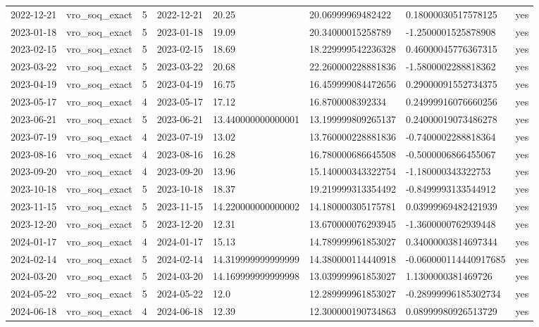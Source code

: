 \begin{tabular}{llllllll}
2022-12-21 & vro\_soq\_exact & 5 & 2022-12-21 & 20.25 & 20.06999969482422 & 0.18000030517578125 & yes \\
2023-01-18 & vro\_soq\_exact & 5 & 2023-01-18 & 19.09 & 20.34000015258789 & -1.2500001525878908 & yes \\
2023-02-15 & vro\_soq\_exact & 5 & 2023-02-15 & 18.69 & 18.229999542236328 & 0.46000045776367315 & yes \\
2023-03-22 & vro\_soq\_exact & 5 & 2023-03-22 & 20.68 & 22.260000228881836 & -1.5800002288818362 & yes \\
2023-04-19 & vro\_soq\_exact & 5 & 2023-04-19 & 16.75 & 16.459999084472656 & 0.29000091552734375 & yes \\
2023-05-17 & vro\_soq\_exact & 4 & 2023-05-17 & 17.12 & 16.8700008392334 & 0.24999916076660256 & yes \\
2023-06-21 & vro\_soq\_exact & 5 & 2023-06-21 & 13.440000000000001 & 13.199999809265137 & 0.24000019073486278 & yes \\
2023-07-19 & vro\_soq\_exact & 4 & 2023-07-19 & 13.02 & 13.760000228881836 & -0.7400002288818364 & yes \\
2023-08-16 & vro\_soq\_exact & 4 & 2023-08-16 & 16.28 & 16.780000686645508 & -0.5000006866455067 & yes \\
2023-09-20 & vro\_soq\_exact & 4 & 2023-09-20 & 13.96 & 15.140000343322754 & -1.180000343322753 & yes \\
2023-10-18 & vro\_soq\_exact & 5 & 2023-10-18 & 18.37 & 19.219999313354492 & -0.8499993133544912 & yes \\
2023-11-15 & vro\_soq\_exact & 5 & 2023-11-15 & 14.220000000000002 & 14.180000305175781 & 0.03999969482421939 & yes \\
2023-12-20 & vro\_soq\_exact & 5 & 2023-12-20 & 12.31 & 13.670000076293945 & -1.3600000762939448 & yes \\
2024-01-17 & vro\_soq\_exact & 4 & 2024-01-17 & 15.13 & 14.789999961853027 & 0.34000003814697344 & yes \\
2024-02-14 & vro\_soq\_exact & 5 & 2024-02-14 & 14.319999999999999 & 14.380000114440918 & -0.060000114440917685 & yes \\
2024-03-20 & vro\_soq\_exact & 5 & 2024-03-20 & 14.169999999999998 & 13.039999961853027 & 1.1300000381469726 & yes \\
2024-05-22 & vro\_soq\_exact & 5 & 2024-05-22 & 12.0 & 12.289999961853027 & -0.28999996185302734 & yes \\
2024-06-18 & vro\_soq\_exact & 4 & 2024-06-18 & 12.39 & 12.300000190734863 & 0.08999980926513729 & yes \\

\end{tabular}
